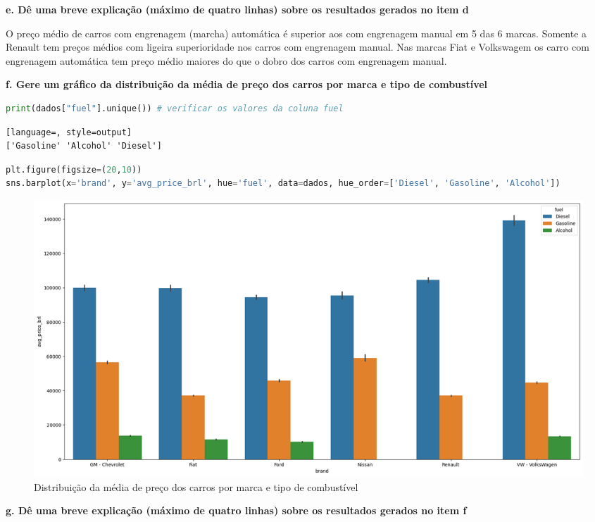 \begin{adjustwidth}{1em}{}
\textbf{e. Dê uma breve explicação (máximo de quatro linhas) sobre os resultados gerados no item d}
\end{adjustwidth}

O preço médio de carros com engrenagem (marcha) automática é superior aos com engrenagem manual em 5 das 6 marcas. Somente a Renault tem preços médios com ligeira superioridade nos carros com engrenagem manual. Nas marcas Fiat e Volkswagem os carro com engrenagem automática tem preço médio maiores do que o dobro dos carros com engrenagem manual.

\begin{adjustwidth}{1em}{}
\textbf{f. Gere um gráfico da distribuição da média de preço dos carros por marca e tipo de combustível}
\end{adjustwidth}
\begin{lstlisting}[language=Python, style=input]
print(dados["fuel"].unique()) # verificar os valores da coluna fuel
\end{lstlisting}
\begin{lstlisting}[language=, style=output]
['Gasoline' 'Alcohol' 'Diesel']
\end{lstlisting}
\begin{lstlisting}[language=Python, style=input]
plt.figure(figsize=(20,10))
sns.barplot(x='brand', y='avg_price_brl', hue='fuel', data=dados, hue_order=['Diesel', 'Gasoline', 'Alcohol'])
\end{lstlisting}
\begin{figure}[H]
\centering
\includegraphics[width=1\linewidth]{apendices/fig/2_IAA002_5.png}
\caption{Distribuição da média de preço dos carros por marca e tipo de combustível}
\end{figure}

\begin{adjustwidth}{1em}{}
\textbf{g. Dê uma breve explicação (máximo de quatro linhas) sobre os resultados gerados no item f}
\end{adjustwidth}

